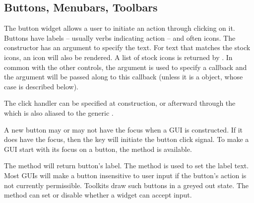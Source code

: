 \subsection{Buttons, Menubars, Toolbars}
\label{sec:gWidgets-buttons}

The button widget allows a user to initiate an action through clicking on
it. Buttons have labels -- usually verbs indicating action -- and often
icons. The  constructor has an argument
 to specify the text.  For text that matches
the stock icons, an icon will also be rendered. A list of stock icons is returned by . In common with the other controls, the argument
 is used to specify a callback and the
 argument will be passed along to this
callback (unless it is a  object, whose case is described
below).

The click handler can be specified at construction, or afterward
through the  which is also aliased
to the generic . 


A new button may or may not have the focus when a GUI is
constructed. If it does have the focus, then the  key will
initiate the button click signal. To make a GUI start with its focus
on a button, the  method is available. 

The  method will return button's label. The
method  is used to set the label text.
Most GUIs will make a button insensitive to user input if the button's
action is not currently permissible. Toolkits draw such buttons in a
greyed out state. The  method can set or
disable whether a widget can accept input.




